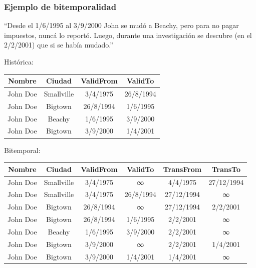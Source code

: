 \begin{frame}
\begin{center}
\frametitle{Ejemplo de bitemporalidad}
	\tiny

	``Desde el 1/6/1995 al 3/9/2000 John se mudó a Beachy, pero para no
	pagar impuestos, nuncá lo reportó. Luego, durante una investigación
	se descubre (en el 2/2/2001) que si se había mudado.''

	\pause
	\vspace{5mm}

	Histórica: \hfill
	\begin{tabular}{|c|c|c|c|}
	\hline
	Nombre   & Ciudad	& ValidFrom	& ValidTo	\\ \hline
	John Doe & Smallville	& 3/4/1975	& 26/8/1994	\\ \hline
	John Doe & Bigtown	& 26/8/1994	& 1/6/1995	\\ \hline
	John Doe & Beachy	& 1/6/1995	& 3/9/2000	\\ \hline
	John Doe & Bigtown	& 3/9/2000	& 1/4/2001	\\ \hline
	\end{tabular}

	\pause
	\vspace{5mm}

	\newcommand{\z}[0]{\alert<4>}

	Bitemporal: \hfill
	\begin{tabular}{|c|c|c|c|c|c|}
	\hline
	Nombre   & Ciudad	& ValidFrom	& ValidTo	& TransFrom	& TransTo	\\ \hline
	John Doe & Smallville	& 3/4/1975	& ∞		& 4/4/1975	& 27/12/1994	\\ \hline
	\z{John Doe} & \z{Smallville}	& \z{3/4/1975}	& \z{26/8/1994}	& \z{27/12/1994}	& \z{∞}	\\ \hline
	John Doe & Bigtown	& 26/8/1994	& ∞		& 27/12/1994	& 2/2/2001	\\ \hline
	\z{John Doe} & \z{Bigtown}	& \z{26/8/1994}	& \z{1/6/1995}	& \z{2/2/2001}	& \z{∞}	\\ \hline
	\z{John Doe} & \z{Beachy}	& \z{1/6/1995}	& \z{3/9/2000}	& \z{2/2/2001}	& \z{∞}	\\ \hline
	John Doe & Bigtown	& 3/9/2000	& ∞		& 2/2/2001	& 1/4/2001	\\ \hline
	\z{John Doe} & \z{Bigtown}	& \z{3/9/2000}	& \z{1/4/2001}	& \z{1/4/2001}	& \z{∞}	\\ \hline
	\end{tabular}
\end{center}
\end{frame}

